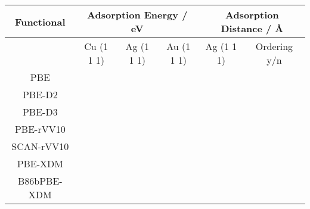 \documentclass[10pt,a4paper,twocolumn,twoside]{extarticle}
\newcommand{\oA}{\si{\angstrom}}
\begin{document}
	\begin{figure*}
		\centering
		\begin{tabular}[]{c|c c c c c}
		Functional & \multicolumn{3}{c}{Adsorption Energy / eV} & \multicolumn{2}{c}{Adsorption Distance / \oA}\\
			\hline
			& Cu (1 1 1) & Ag (1 1 1) & Au (1 1 1) & Ag (1 1 1) & Ordering y/n \\
		PBE	& \\
		PBE-D2 & \\
		PBE-D3 &\\
		PBE-rVV10 & \\
		SCAN-rVV10 &\\
		PBE-XDM & \\
		B86bPBE-XDM & \\

		\end{tabular}
	\end{figure*}
	


	\newpage
	\printbibliography
\end{document}
